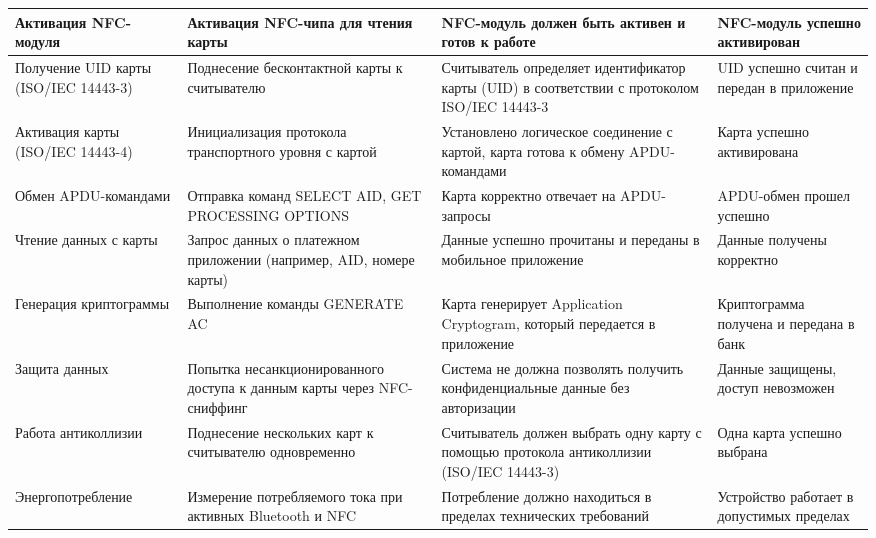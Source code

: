 \begin{longtable}[l]{| P{0.2\textwidth} | P{0.3\textwidth} | P{0.2\textwidth} | P{0.2\textwidth}|}
    Активация NFC-модуля &
    Активация NFC-чипа для чтения карты &
    NFC-модуль должен быть активен и готов к работе &
    NFC-модуль успешно активирован \\
    \hline

    Получение UID карты (ISO/IEC 14443-3) &
    Поднесение бесконтактной карты к считывателю &
    Считыватель определяет идентификатор карты (UID) в соответствии с протоколом ISO/IEC 14443-3 &
    UID успешно считан и передан в приложение \\
    \hline

    Активация карты (ISO/IEC 14443-4) &
    Инициализация протокола транспортного уровня с картой &
    Установлено логическое соединение с картой, карта готова к обмену APDU-командами &
    Карта успешно активирована \\
    \hline

    Обмен APDU-командами &
    Отправка команд SELECT AID, GET PROCESSING OPTIONS &
    Карта корректно отвечает на APDU-запросы &
    APDU-обмен прошел успешно \\
    \hline

    Чтение данных с карты &
    Запрос данных о платежном приложении (например, AID, номере карты) &
    Данные успешно прочитаны и переданы в мобильное приложение &
    Данные получены корректно \\
    \hline

    Генерация криптограммы &
    Выполнение команды GENERATE AC &
    Карта генерирует Application Cryptogram, который передается в приложение &
    Криптограмма получена и передана в банк \\
    \hline

    Защита данных &
    Попытка несанкционированного доступа к данным карты через NFC-сниффинг &
    Система не должна позволять получить конфиденциальные данные без авторизации &
    Данные защищены, доступ невозможен \\
    \hline

    Работа антиколлизии &
    Поднесение нескольких карт к считывателю одновременно &
    Считыватель должен выбрать одну карту с помощью протокола антиколлизии (ISO/IEC 14443-3) &
    Одна карта успешно выбрана \\
    \hline

    Энергопотребление &
    Измерение потребляемого тока при активных Bluetooth и NFC &
    Потребление должно находиться в пределах технических требований &
    Устройство работает в допустимых пределах \\
    \hline


\end{longtable}
